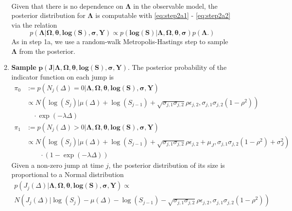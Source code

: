 \begin{enumerate}
\begin{enumerate}
\begin{multline}
    \end{multline}
    Given that there is no dependence on $\boldsymbol{\Lambda}$ in the observable model, the posterior distribution for $\boldsymbol{\Lambda}$ is computable with \eqref{eq:step2a1} - \eqref{eq:step2a2} via the relation
    \[
      p(\boldsymbol{\Lambda} | \boldsymbol{\Omega}, \boldsymbol{\theta}, \boldsymbol{\mbox{log}(S)}, \boldsymbol{\sigma},\boldsymbol{Y}) \propto p(\boldsymbol{\mbox{log}(S)} | \boldsymbol{\Lambda}, \boldsymbol{\Omega}, \boldsymbol{\theta}, \boldsymbol{\sigma}) p(\boldsymbol{\Lambda}.)
    \]
    As in step 1a, we use a random-walk Metropolis-Hastings step to sample $\boldsymbol{\Lambda}$ from the posterior.
    
  \item \textbf{Sample} $\boldsymbol{p(J | \Lambda, \Omega, \theta, \mbox{log}(S), \sigma,Y)}.$
    The posterior probability of the indicator function on each jump  is
    \begin{align*}
      \pi_0 &:= p(N_j(\Delta) = 0 | \boldsymbol{\Lambda}, \boldsymbol{\Omega}, \boldsymbol{\theta}, \boldsymbol{\mbox{log}(S)}, \boldsymbol{\sigma}, \boldsymbol{Y} ) \\
            &\propto N\left(\log(S_j) | \mu(\Delta) + \log(S_{j-1}) + \sqrt{\sigma_{j,1}\sigma_{j,2}}\rho\epsilon_{j,2}, \sigma_{j,1}\sigma_{j,2}(1-\rho^2)\right) \\
      & \quad \cdot \exp(-\lambda \Delta) \\
      \pi_1 &:= p(N_j(\Delta) > 0 | \boldsymbol{\Lambda}, \boldsymbol{\Omega}, \boldsymbol{\theta}, \boldsymbol{\mbox{log}(S)}, \boldsymbol{\sigma}, \boldsymbol{Y} ) \\
      & \propto N\left(\log(S_j) | \mu(\Delta) + \log(S_{j-1}) + \sqrt{\sigma_{j,1}\sigma_{j,2}}\rho\epsilon_{j,2} + \mu_J, \sigma_{j,1}\sigma_{j,2}(1-\rho^2) + \sigma_J^2 \right) \\
      & \quad\quad \cdot (1-\exp(-\lambda \Delta))
    \end{align*}
    Given a non-zero jump at time $j$, the posterior distribution of
    its size is proportional to a Normal distribution
    \begin{multline*}
      p(J_j(\Delta) | \boldsymbol{\Lambda}, \boldsymbol{\Omega}, \boldsymbol{\theta}, \boldsymbol{\mbox{log}(S)}, \boldsymbol{\sigma},\boldsymbol{Y}) \propto \\
      N\left(J_j(\Delta) |\log(S_j) - \mu(\Delta) - \log(S_{j-1}) - \sqrt{\sigma_{j,1}\sigma_{j,2}}\rho\epsilon_{j,2}, \sigma_{j,1}\sigma_{j,2}(1-\rho^2) \right)\\

\end{multline*}
\end{enumerate}
\end{enumerate}
